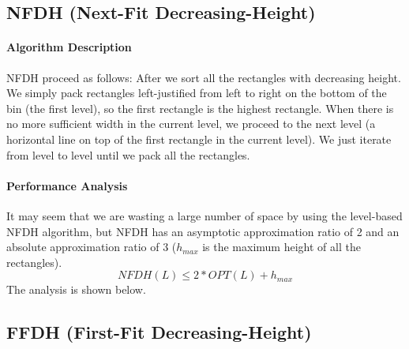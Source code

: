 \documentclass[sigplan,screen,nonacm]{acmart}\settopmatter{printfolios=true,printccs=false,printacmref=false}
\begin{document}
\subsection{NFDH (Next-Fit Decreasing-Height)}
\paragraph*{Algorithm Description}
NFDH proceed as follows: After we sort all the rectangles with decreasing height. We simply pack rectangles left-justified from left to right on the bottom of the bin (the first level), so the first rectangle is the highest rectangle. When there is no more sufficient width in the current level, we proceed to the next level (a horizontal line on top of the first rectangle in the current level). We just iterate from level to level until we pack all the rectangles.
\paragraph{Performance Analysis}
It may seem that we are wasting a large number of space by using the level-based NFDH algorithm, but NFDH has an asymptotic approximation ratio of 2 and an absolute approximation ratio of 3 ($h_{max}$ is the maximum height of all the rectangles).
$$NFDH(L) \leq 2*OPT(L) + h_{max}$$
The analysis is shown below.\par

\subsection{FFDH (First-Fit Decreasing-Height)}


\end{document}
